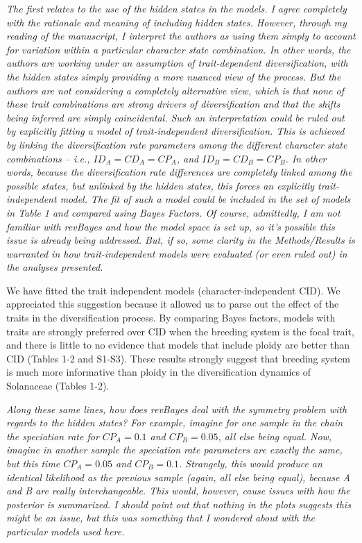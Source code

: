 \documentclass[11pt]{article}
\renewenvironment{quote}{\bigskip\noindent\itshape\ignorespaces}{\smallskip}
\begin{document}
\begin{quote}
The first relates to the use of the hidden states in the models.
I agree completely with the rationale and meaning of including hidden states.
However, through my reading of the manuscript, I interpret the authors as using them simply to account for variation within a particular character state combination.
In other words, the authors are working under an assumption of trait-dependent diversification, with the hidden states simply providing a more nuanced view of the process.
But the authors are not considering a completely alternative view, which is that none of these trait combinations are strong drivers of diversification and that the shifts being inferred are simply coincidental.
Such an interpretation could be ruled out by explicitly fitting a model of trait-independent diversification.
This is achieved by linking the diversification rate parameters among the different character state combinations -- i.e., $ID_A=CD_A=CP_A$, and $ID_B=CD_B=CP_B$.
In other words, because the diversification rate differences are completely linked among the possible states, but unlinked by the hidden states, this forces an explicitly trait-independent model.
The fit of such a model could be included in the set of models in Table 1 and compared using Bayes Factors.
Of course, admittedly, I am not familiar with revBayes and how the model space is set up, so it's possible this issue is already being addressed.
But, if so, some clarity in the Methods/Results is warranted in how trait-independent models were evaluated (or even ruled out) in the analyses presented.
\end{quote}

We have fitted the trait independent models (character-independent CID). 
We appreciated this suggestion because it allowed us to parse out the effect of the traits in the diversification process. 
By comparing Bayes factors, models with traits are strongly preferred over CID when the breeding system is the focal trait, and there is little to no evidence that models that include ploidy are better than CID (Tables 1-2 and S1-S3). 
These results strongly suggest that breeding system is much more informative than ploidy in the diversification dynamics of Solanaceae (Tables 1-2).


\begin{quote}
Along these same lines, how does revBayes deal with the symmetry problem with regards to the hidden states?
For example, imagine for one sample in the chain the speciation rate for $CP_A=0.1$ and $CP_B=0.05$, all else being equal.
Now, imagine in another sample the speciation rate parameters are exactly the same, but this time $CP_A=0.05$ and $CP_B=0.1$. 
Strangely, this would produce an identical likelihood as the previous sample (again, all else being equal), because A and B are really interchangeable.
This would, however, cause issues with how the posterior is summarized.
I should point out that nothing in the plots suggests this might be an issue, but this was something that I wondered about with the particular models used here.
\end{quote}
\end{document}
